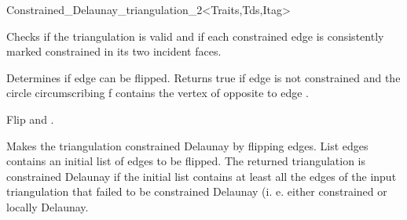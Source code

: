 \begin{ccRefClass}{Constrained_Delaunay_triangulation_2<Traits,Tds,Itag>}

{ Checks if the triangulation is valid and if each constrained edge is
 consistently marked constrained in its two incident faces.}

\begin{ccAdvanced}

{ Determines if edge  can be flipped. Returns true if
edge  is not constrained and  the circle circumscribing f
contains  the vertex of 
opposite to edge . }

{ Flip  and .}


{ Makes the triangulation constrained Delaunay by flipping edges. 
List edges contains an
initial list of edges to be flipped. The returned
triangulation is constrained Delaunay 
if the initial list contains at least all the edges of the
input triangulation that failed to be 
constrained Delaunay (i. e. either constrained or
locally Delaunay. }
\end{ccAdvanced}


\ccSeeAlso
{} \\
 \\
 \\
 \\
 \\





\end{ccRefClass}


